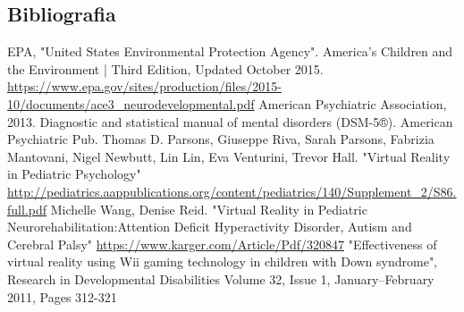 \subsection{Bibliografia} \label{subsec:biblio}
\renewcommand\refname{}
\begin{thebibliography}{100}
 EPA, "United States Environmental Protection Agency". America's Children and the Environment | Third Edition, Updated October 2015. 
\url{https://www.epa.gov/sites/production/files/2015-10/documents/ace3_neurodevelopmental.pdf}
 American Psychiatric Association, 2013. Diagnostic and statistical manual of mental disorders (DSM-5®). American Psychiatric Pub. 
 Thomas D. Parsons, Giuseppe Riva, Sarah Parsons, Fabrizia Mantovani, Nigel Newbutt, Lin Lin, Eva Venturini, Trevor Hall. "Virtual Reality in Pediatric Psychology"
\url{http://pediatrics.aappublications.org/content/pediatrics/140/Supplement_2/S86.full.pdf}
 Michelle Wang, Denise Reid. "Virtual Reality in Pediatric Neurorehabilitation:Attention Deficit Hyperactivity Disorder, Autism and Cerebral Palsy"
\url{https://www.karger.com/Article/Pdf/320847} 
 "Effectiveness of virtual reality using Wii gaming technology in children with Down syndrome", Research in Developmental Disabilities Volume 32, Issue 1, January–February 2011, Pages 312-321

\end{thebibliography}